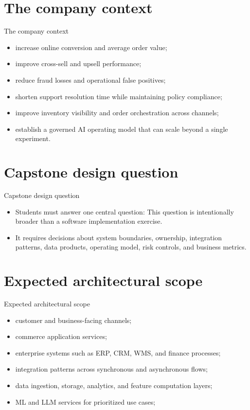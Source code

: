\documentclass[aspectratio=169]{beamer}
\begin{document}
\section{The company context}

\begin{frame}{The company context}
  \begin{itemize}
    \item increase online conversion and average order value;
    \item improve cross-sell and upsell performance;
    \item reduce fraud losses and operational false positives;
    \item shorten support resolution time while maintaining policy compliance;
    \item improve inventory visibility and order orchestration across channels;
    \item establish a governed AI operating model that can scale beyond a single experiment.
  \end{itemize}
\end{frame}

\section{Capstone design question}

\begin{frame}{Capstone design question}
  \begin{itemize}
    \item Students must answer one central question: This question is intentionally broader than a software implementation exercise.
    \item It requires decisions about system boundaries, ownership, integration patterns, data products, operating model, risk controls, and business metrics.
  \end{itemize}
\end{frame}

\section{Expected architectural scope}

\begin{frame}{Expected architectural scope}
  \begin{itemize}
    \item customer and business-facing channels;
    \item commerce application services;
    \item enterprise systems such as ERP, CRM, WMS, and finance processes;
    \item integration patterns across synchronous and asynchronous flows;
    \item data ingestion, storage, analytics, and feature computation layers;
    \item ML and LLM services for prioritized use cases;
  \end{itemize}
\end{frame}
\end{document}
